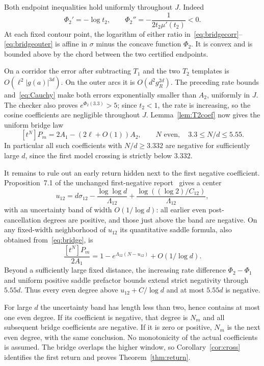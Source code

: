 \documentclass[11pt,a4paper]{article}
\begin{document}
Both endpoint inequalities hold uniformly throughout $J$. Indeed
\[
 \Phi_2'=-\log t_2,\qquad
 \Phi_2''=-\frac1{2t_2\mu'(t_2)}<0.
\]
At each fixed contour point, the logarithm of either ratio in~\eqref{eq:bridgecorr}--\eqref{eq:bridgeouter} is affine in $\sigma$ minus the concave function $\Phi_2$. It is convex and is bounded above by the chord between the two certified endpoints.

On a corridor the error after subtracting $T_1$ and the two $T_2$ templates is $O(\ell^2|g(a)|^{3d})$. On the outer arcs it is $O(d^2g_R^{2d})$. The preceding rate bounds and~\eqref{eq:Cauchy} make both errors exponentially smaller than $A_2$, uniformly in $J$. The checker also proves $e^{\Phi_2(3.3)}>5$; since $t_2<1$, the rate is increasing, so the cosine coefficients are negligible throughout $J$. Lemma~\ref{lem:T2coef} now gives the uniform bridge law
\begin{equation}\label{eq:bridge}
 [t^N]P_m=2A_1-(2\ell+O(1))A_2,
 \qquad N\text{ even},\quad3.3\le N/d\le5.55.
\end{equation}
In particular all such coefficients with $N/d\ge3.332$ are negative for sufficiently large $d$, since the first model crossing is strictly below $3.332$.

It remains to rule out an early return hidden next to the first negative coefficient. Proposition~7.1 of the unchanged first-negative report~\cite{First} gives a center
\[
 u_{12}=d\sigma_{12}-\frac{\log\log d}{\Lambda_{12}}
       +\frac{\log((\log2)/C_{12})}{\Lambda_{12}},
\]
with an uncertainty band of width $O(1/\log d)$: all earlier even post-cancellation degrees are positive, and those just above the band are negative. On any fixed-width neighborhood of $u_{12}$ its quantitative saddle formula, also obtained from~\eqref{eq:bridge}, is
\[
 \frac{[t^N]P_m}{2A_1}
 =1-e^{\Lambda_{12}(N-u_{12})}+O(1/\log d).
\]
Beyond a sufficiently large fixed distance, the increasing rate difference $\Phi_2-\Phi_1$ and uniform positive saddle prefactor bounds extend strict negativity through $5.55d$. Thus every even degree above $u_{12}+C/\log d$ and at most $5.55d$ is negative.

For large $d$ the uncertainty band has length less than two, hence contains at most one even degree. If its coefficient is negative, that degree is $N_m$ and all subsequent bridge coefficients are negative. If it is zero or positive, $N_m$ is the next even degree, with the same conclusion. No monotonicity of the actual coefficients is assumed. The bridge overlaps the higher window, so Corollary~\ref{cor:cross} identifies the first return and proves Theorem~\ref{thm:return}.
\end{document}
